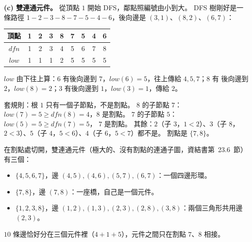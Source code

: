 \begin{pastsoln}
\textbf{(c) 雙連通元件。} 從頂點 $1$ 開始 DFS，鄰點照編號由小到大。 DFS 樹剛好是一條路徑
$1 - 2 - 3 - 8 - 7 - 5 - 4 - 6$，後向邊是 $(3, 1)$、$(8, 2)$、$(6, 7)$：
\begin{center}
\begin{tabular}{c*{8}{c}}
\toprule
頂點 & 1 & 2 & 3 & 8 & 7 & 5 & 4 & 6 \\
\midrule
$\mathit{dfn}$ & 1 & 2 & 3 & 4 & 5 & 6 & 7 & 8 \\
$\mathit{low}$ & 1 & 1 & 1 & 2 & 5 & 5 & 5 & 5 \\
\bottomrule
\end{tabular}
\end{center}
$\mathit{low}$ 由下往上算：$6$ 有後向邊到 $7$，$\mathit{low}(6) = 5$，往上傳給 $4, 5, 7$；$8$ 有
後向邊到 $2$，$\mathit{low}(8) = 2$；$3$ 有後向邊到 $1$，$\mathit{low}(3) = 1$，傳給 $2$。

套規則：根 $1$ 只有一個子節點，不是割點。 $8$ 的子節點 $7$：$\mathit{low}(7) = 5 \ge
\mathit{dfn}(8) = 4$，$8$ 是割點。 $7$ 的子節點 $5$：$\mathit{low}(5) = 5 \ge \mathit{dfn}(7) = 5$，
$7$ 是割點。 其餘：$2$（子 $3$，$1 < 2$）、$3$（子 $8$，$2 < 3$）、$5$（子 $4$，$5 < 6$）、$4$（子
$6$，$5 < 7$）都不是。 割點是 $\{7, 8\}$。

在割點處切開，雙連通元件（極大的、沒有割點的連通子圖，資結書第~23.6~節）有三個：
\begin{itemize}
\item $\{4, 5, 6, 7\}$，邊 $(4,5), (4,6), (5,7), (6,7)$：一個四邊形環。
\item $\{7, 8\}$，邊 $(7,8)$：一座橋，自己是一個元件。
\item $\{1, 2, 3, 8\}$，邊 $(1,2), (1,3), (2,3), (2,8), (3,8)$：兩個三角形共用邊 $(2,3)$。
\end{itemize}
$10$ 條邊恰好分在三個元件裡（$4 + 1 + 5$），元件之間只在割點 $7$、$8$ 相接。
\end{pastsoln}
